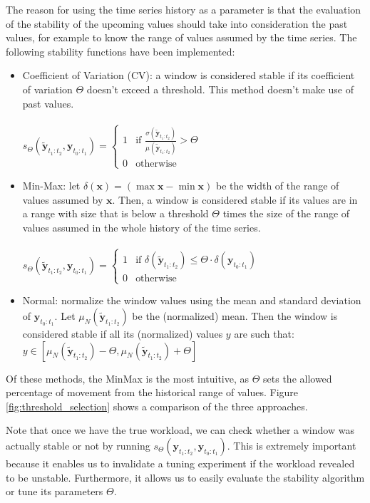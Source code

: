 \documentclass[a4paper, 12pt]{article} %
\begin{document}
	The reason for using the time series history as a parameter is that the evaluation of the stability of the upcoming values should take into consideration the past values, for example to know the range of values  assumed by the time series. The following stability functions have been implemented:
	\begin{itemize}
		\item Coefficient of Variation (CV): a window is considered stable if its coefficient of variation $\Theta$ doesn't exceed a threshold. This method doesn't make use of past values.\\\\
		$
		s_\Theta(\tilde{\pmb{y}}_{t_1:t_2}, \pmb{y}_{t_0:t_1}) = \begin{cases}
			1 & \text{if } \frac{\sigma (\tilde{\pmb{y}}_{t_1:t_2})}{\mu (\tilde{\pmb{y}}_{t_1:t_2})} > \Theta\\
			0 & \text{otherwise}
		\end{cases}    
		$
		\item Min-Max: let $\delta (\pmb{x}) = (\max{\pmb{x}} - \min{\pmb{x}})$ be the width of the range of values assumed by $\pmb{x}$. Then, a window is considered stable if its values are in a range with size that is below a threshold $\Theta$ times the size of the range of values assumed in the whole history of the time series.\\\\
		$
		s_\Theta(\tilde{\pmb{y}}_{t_1:t_2}, \pmb{y}_{t_0:t_1}) = \begin{cases}
			1 & \text{if } \delta (\tilde{\pmb{y}}_{t_1:t_2}) \leq \Theta \cdot \delta (\pmb{y}_{t_0:t_1}) \\
			0 & \text{otherwise}
		\end{cases}    
		$
		\item Normal: normalize the window values using the mean and standard deviation of $\pmb{y}_{t_0:t_1}$. Let $\mu_N (\tilde{\pmb{y}}_{t_1:t_2})$ be the (normalized) mean. Then the window is considered stable if all its (normalized) values $y$ are such that: $y \in [\mu_N (\tilde{\pmb{y}}_{t_1:t_2}) - \Theta, \mu_N (\tilde{\pmb{y}}_{t_1:t_2}) + \Theta]$
	\end{itemize}
	Of these methods, the MinMax is the most intuitive, as $\Theta$ sets the allowed percentage of movement from the historical range of values. Figure \ref{fig:threshold_selection} shows a comparison of the three approaches.
	
	Note that once we have the true workload, we can check whether a window was actually stable or not by running $s_\Theta(\pmb{y}_{t_1:t_2}, \pmb{y}_{t_0:t_1})$. This is extremely important because it enables us to invalidate a tuning experiment if the workload revealed to be unstable. Furthermore, it allows us to easily evaluate the stability algorithm or tune its parameters $\Theta$.
	
\end{document}
